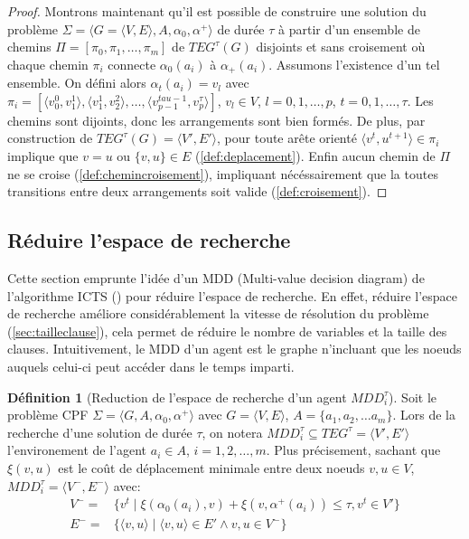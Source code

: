 \documentclass[french, 10pt, letterpaper]{article}
\theoremstyle{definition}
\newtheorem{definition}{Définition}[subsection]
\theoremstyle{proposition}
\theoremstyle{example}
\begin{document}
\begin{proof}
        Montrons maintenant qu'il est possible de construire une solution du problème $\Sigma = \langle G = \langle V, E \rangle, A, \alpha_0, \alpha^+ \rangle$ de durée $\tau$ 
        à partir d'un ensemble de chemins $\Pi = [\pi_0, \pi_1, \ldots, \pi_m]$ de $TEG^\tau(G)$ disjoints et sans croisement 
        où chaque chemin $\pi_i$ connecte $\alpha_0(a_i)$ à $\alpha_+(a_i)$. 
        Assumons l'existence d'un tel ensemble. 
        On défini alors $\alpha_t(a_i) = v_l$ avec $\pi_i = [\langle v_0^0, v_1^1 \rangle, \langle v_1^1, v_2^2 \rangle, \ldots, 
        \langle v_{p-1}^{tau-1}, v_p^\tau \rangle]$, $v_l \in V$, $l = 0, 1, \ldots, p$, $t = 0, 1, \ldots, \tau$.
        Les chemins sont dijoints, donc les arrangements sont bien formés. 
        De plus, par construction de $TEG^\tau(G) = \langle V', E' \rangle$, pour toute arête orienté $\langle v^t, u^{t+1} \rangle \in \pi_i$ 
        implique que $v = u$ ou $\{v, u\} \in E$ (\ref{def:deplacement}). 
        Enfin aucun chemin de $\Pi$ ne se croise (\ref{def:chemincroisement}), impliquant nécéssairement que la toutes transitions entre deux arrangements
        soit valide (\ref{def:croisement}).


    \end{proof}

    \subsection{Réduire l'espace de recherche}
    \label{sec:mdd}

    Cette section emprunte l'idée d'un MDD (Multi-value decision diagram) de l'algorithme ICTS (\cite{ICTS}) pour réduire l'espace de recherche.
    En effet, réduire l'espace de recherche améliore considérablement la vitesse de résolution du problème (\ref{sec:tailleclause}), 
    cela permet de réduire le nombre de variables et la taille des clauses.
    Intuitivement, le MDD d'un agent est le graphe n'incluant que les noeuds auquels celui-ci peut accéder dans le temps imparti.

    \begin{definition}[Reduction de l'espace de recherche d'un agent $MDD_i^\tau$]
        Soit le problème CPF $\Sigma = \langle G, A, \alpha_0, \alpha^+ \rangle$ avec $G = \langle V, E \rangle$, $A = \{a_1, a_2, \ldots a_m\}$.
        Lors de la recherche d'une solution de durée $\tau$, on notera $MDD_i^\tau \subseteq TEG^\tau = \langle V', E' \rangle$ l'environement de l'agent 
        $a_i \in A$, $i = 1, 2, \dots, m$. Plus précisement, sachant que $\xi(v, u)$ est le coût de déplacement minimale entre deux noeuds $v, u \in V$, 
        $MDD_i^\tau = \langle V^-, E^- \rangle$ avec:
        \begin{align*}
            V^- =& \{v^t\;|\; \xi(\alpha_0(a_i), v) + \xi(v, \alpha^+(a_i)) \leq \tau, v^t \in V'\}\\
            E^- =& \{\langle v, u \rangle \;|\; \langle v, u \rangle \in E' \land v, u \in V^-\}
        \end{align*} 
    \end{definition}
\end{document}
